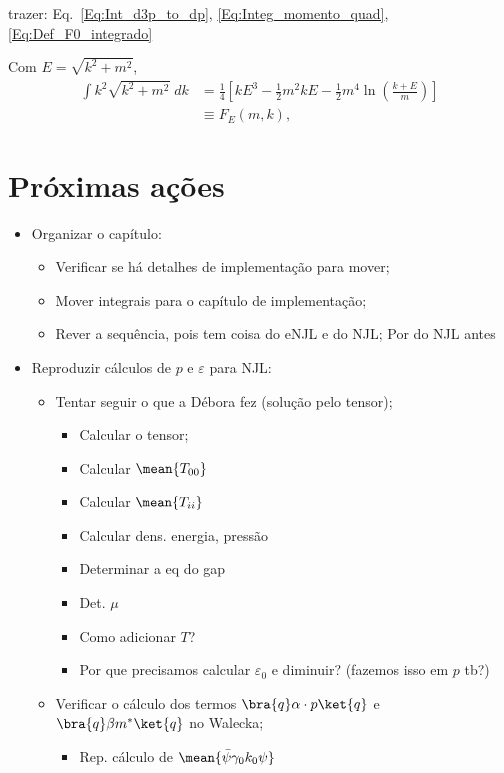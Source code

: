 trazer: Eq.~\ref{Eq:Int_d3p_to_dp}, \eqref{Eq:Integ_momento_quad}, \eqref{Eq:Def_F0_integrado}

Com $E = \sqrt{k^2 + m^2}$, 
\begin{align} \label{Eq:Def_F_E}
	\int k^2 \sqrt{k^2 + m^2} \;dk &= \frac{1}{4}\left[k E^3 - \frac{1}{2} m^2 k E - \frac{1}{2} m^4\ln\left(\frac{k+E}{m}\right)\right] \\
	&\equiv F_E(m, k),
\end{align}

\section{Próximas ações}

\begin{itemize}
	\item Organizar o capítulo:
		\begin{itemize}
			\item Verificar se há detalhes de implementação para mover;
			\item Mover integrais para o capítulo de implementação;
			\item Rever a sequência, pois tem coisa do eNJL e do NJL; Por do NJL antes
		\end{itemize}
	\item Reproduzir cálculos de $p$ e $\varepsilon$ para NJL:
		\begin{itemize}
			\item Tentar seguir o que a Débora fez (solução pelo tensor);
				\begin{itemize}
					\item Calcular o tensor;
					\item Calcular $\mean{T_{00}}$
					\item Calcular $\mean{T_{ii}}$
					\item Calcular dens. energia, pressão
					\item Determinar a eq do gap
					\item Det. $\mu$
					\item Como adicionar $T$?
					\item Por que precisamos calcular $\varepsilon_0$ e diminuir? (fazemos isso em $p$ tb?)
				\end{itemize}
			\item Verificar o cálculo dos termos $\bra{q}\alpha\cdot p\ket{q}$ e $\bra{q}\beta m^*\ket{q}$ no Walecka;
				\begin{itemize}
					\item Rep. cálculo de $\mean{\bar\psi\gamma_0 k_0\psi}$

\end{itemize}
\end{itemize}
\end{itemize}
